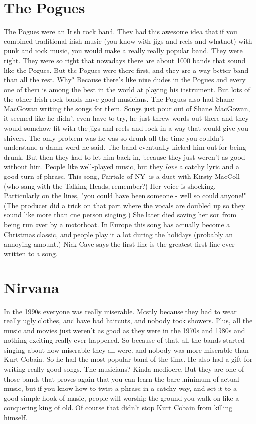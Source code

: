 \documentclass[letterpaper,12pt,single]{article}
\begin{document}
\section{The Pogues}

The Pogues were an Irish rock band. They had this awesome idea that if you combined traditional irish music (you know with jigs and reels and whatnot) with punk and rock music, you would make a really really popular band. They were right. They were so right that nowadays there are about 1000 bands that sound like the Pogues. But the Pogues were there first, and they are a way better band than all the rest. Why? Because there's like nine dudes in the Pogues and every one of them is among the best in the world at playing his instrument. But lots of the other Irish rock bands have good musicians. The Pogues also had Shane MacGowan writing the songs for them. Songs just pour out of Shane MacGowan, it seemed like he didn't even have to try, he just threw words out there and they would somehow fit with the jigs and reels and rock in a way that would give you shivers. The only problem was he was so drunk all the time you couldn't understand a damn word he said. The band eventually kicked him out for being drunk. But then they had to let him back in, because they just weren't as good without him. People like well-played music, but they \emph{love} a catchy lyric and a good turn of phrase. This song, Fairtale of NY, is a duet with Kirsty MacColl (who sang with the Talking Heads, remember?) Her voice is shocking. Particularly on the lines, "you could have been someone - well so could anyone!" (The producer did a trick on that part where the vocals are doubled up so they sound like more than one person singing.) She later died saving her son from being run over by a motorboat. In Europe this song has actually become a Christmas classic, and people play it a lot during the holidays (probably an annoying amount.) Nick Cave says the first line is the greatest first line ever written to a song.

\section{Nirvana}

In the 1990s everyone was really miserable. Mostly because they had to wear really ugly clothes, and have bad haircuts, and nobody took showers. Plus, all the music and movies just weren't as good as they were in the 1970s and 1980s and nothing exciting really ever happened. So because of that, all the bands started singing about how miserable they all were, and nobody was more miserable than Kurt Cobain. So he had the most popular band of the time. He also had a gift for writing really good songs. The musicians? Kinda mediocre. But they are one of those bands that proves again that you can learn the bare minimum of actual music, but if you know how to twist a phrase in a catchy way, and set it to a good simple hook of music, people will worship the ground you walk on like a conquering king of old. Of course that didn't stop Kurt Cobain from killing himself.
\end{document}
